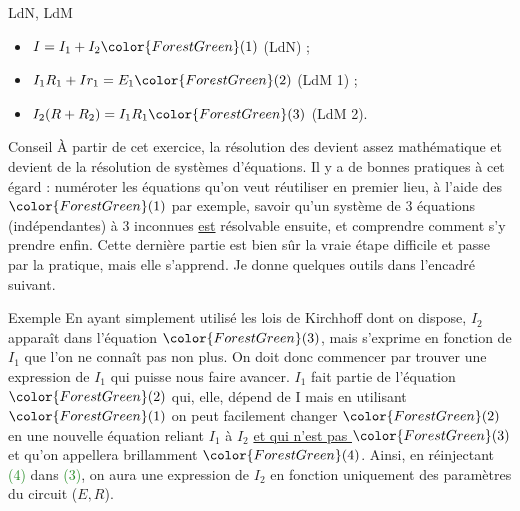 \documentclass[../main/main.tex]{subfiles}
\begin{document}
\begin{tcbraster}[raster columns=5, raster equal height=rows]
\begin{tcolorbox}[blankest, raster multicolumn=2, space to=\myspace]
\begin{tcbraster}[raster columns=1]
            \begin{NCdemo}{{LdN, LdM}}
                \begin{itemize}
                    \item $I = I_1 + I_2 \color{ForestGreen}(1)$ (LdN) ;
                    \item $I_1R_1 + Ir_1 = E_1 \color{ForestGreen}(2)$ (LdM 1) ;
                    \item $I_2(R+R_2) = I_1R_1 \color{ForestGreen}(3)$ (LdM 2).
                \end{itemize}
            \end{NCdemo}
        \end{tcbraster}
    \end{tcolorbox}
\end{tcbraster}
\begin{tcbraster}[raster columns=2, raster equal height=rows]
    \begin{NCimpo}{Conseil}
        À partir de cet exercice, la résolution des devient assez
        mathématique et devient de la résolution de systèmes d'équations. Il y a
        de bonnes pratiques à cet égard : numéroter les équations qu'on veut
        réutiliser en premier lieu, à l'aide des $\color{ForestGreen}(1)$ par
        exemple, savoir qu'un système de 3 équations (indépendantes) à 3
        inconnues \underline{est} résolvable ensuite, et comprendre comment s'y
        prendre enfin. Cette dernière partie est bien sûr la vraie étape
        difficile et passe par la pratique, mais elle s'apprend. Je donne
        quelques outils dans l'encadré suivant.
    \end{NCimpo}
    \begin{NCrema}{Exemple}
        En ayant simplement utilisé les lois de Kirchhoff dont on dispose, $I_2$
        apparaît dans l'équation $ \color{ForestGreen}(3)$, mais s'exprime en
        fonction de $I_1$ que l'on ne connaît pas non plus. On doit donc
        commencer par trouver une expression de $I_1$ qui puisse nous faire
        avancer. $I_1$ fait partie de l'équation $\color{ForestGreen}(2)$ qui,
        elle, dépend de I mais en utilisant $\color{ForestGreen}(1)$ on peut
        facilement changer $ \color{ForestGreen}(2)$ en une nouvelle équation
        reliant $I_1$ à $I_2$ \underline{et qui n'est pas $\color{ForestGreen}
        (3)$} et qu'on appellera brillamment $ \color{ForestGreen}(4)$. Ainsi, 
        en réinjectant \textcolor{ForestGreen}{(4)} dans
        \textcolor{ForestGreen}{(3)}, on aura une expression de $I_2$ en
        fonction uniquement des paramètres du circuit ($E, R$).
    \end{NCrema}
\end{tcbraster}
\end{document}
